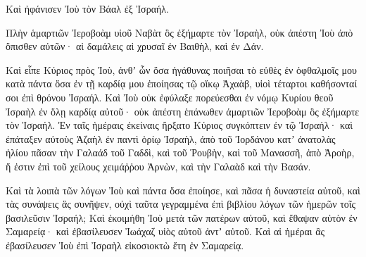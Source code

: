 {Καὶ ἠφάνισεν Ἰοὺ τὸν Βάαλ ἐξ Ἰσραήλ.
\par }{\PP {}Πλὴν ἁμαρτιῶν Ἰεροβοὰμ υἱοῦ Ναβὰτ ὃς ἐξήμαρτε τὸν Ἰσραὴλ, οὐκ ἀπέστη Ἰοὺ ἀπὸ ὄπισθεν αὐτῶν· αἱ δαμάλεις αἱ χρυσαῖ ἐν Βαιθὴλ, καὶ ἐν Δάν.
\par }{\PP {}Καὶ εἶπε Κύριος πρὸς Ἰοὺ, ἀνθʼ ὧν ὅσα ἠγάθυνας ποιῆσαι τὸ εὐθὲς ἐν ὀφθαλμοῖς μου κατὰ πάντα ὅσα ἐν τῇ καρδίᾳ μου ἐποίησας τῷ οἴκῳ Ἀχαὰβ, υἱοὶ τέταρτοι καθήσονταί σοι ἐπὶ θρόνου Ἰσραήλ.
Καὶ Ἰοὺ οὐκ ἐφύλαξε πορεύεσθαι ἐν νόμῳ Κυρίου θεοῦ Ἰσραὴλ ἐν ὅλῃ καρδίᾳ αὐτοῦ· οὐκ ἀπέστη ἑπάνωθεν ἁμαρτιῶν Ἰεροβοὰμ ὃς ἐξήμαρτε τὸν Ἰσραήλ.
Ἐν ταῖς ἡμέραις ἐκείναις ἤρξατο Κύριος συγκόπτειν ἐν τῷ Ἰσραήλ· καὶ ἐπάταξεν αὐτοὺς Ἀζαὴλ ἐν παντὶ ὁρίῳ Ἰσραὴλ,
ἀπὸ τοῦ Ἰορδάνου κατʼ ἀνατολὰς ἡλίου πᾶσαν τὴν Γαλαάδ τοῦ Γαδδὶ, καὶ τοῦ Ῥουβὴν, καὶ τοῦ Μανασσῆ, ἀπὸ Ἀροὴρ, ἥ ἐστιν ἐπὶ τοῦ χείλους χειμάῤῥου Ἀρνὼν, καὶ τὴν Γαλαὰδ καὶ τὴν Βασάν.
\par }{\PP {}Καὶ τὰ λοιπὰ τῶν λόγων Ἰοὺ καὶ πάντα ὅσα ἐποίησε, καὶ πᾶσα ἡ δυναστεία αὐτοῦ, καὶ τὰς συνάψεις ἃς συνῆψεν, οὐχὶ ταῦτα γεγραμμένα ἐπὶ βιβλίου λόγων τῶν ἡμερῶν τοῖς βασιλεῦσιν Ἰσραήλ;
Καὶ ἐκοιμήθη Ἰοὺ μετὰ τῶν πατέρων αὐτοῦ, καὶ ἔθαψαν αὐτὸν ἐν Σαμαρείᾳ· καὶ ἐβασίλευσεν Ἰωάχαζ υἱὸς αὐτοῦ ἀντʼ αὐτοῦ.
Καὶ αἱ ἡμέραι ἃς ἐβασίλευσεν Ἰοὺ ἐπὶ Ἰσραὴλ εἰκοσιοκτὼ ἔτη ἐν Σαμαρείᾳ.

}
